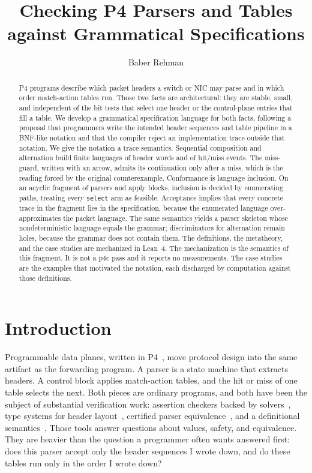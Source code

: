 \documentclass[a4paper,UKenglish,cleveref,autoref]{lipics-v2021}
\title{Checking P4 Parsers and Tables against Grammatical Specifications}
\author{Baber Rehman}{Huawei Technologies, Hong Kong SAR, China}{brehman@connect.hku.hk}{}{}
\begin{document}
\maketitle

\begin{abstract}
P4 programs describe which packet headers a switch or NIC may parse and in which order match-action tables run.
Those two facts are architectural: they are stable, small, and independent of the bit tests that select one header or the control-plane entries that fill a table.
We develop a grammatical specification language for both facts, following a proposal that programmers write the intended header sequences and table pipeline in a BNF-like notation and that the compiler reject an implementation trace outside that notation.
We give the notation a trace semantics.
Sequential composition and alternation build finite languages of header words and of hit/miss events.
The miss-guard, written with an arrow, admits its continuation only after a miss, which is the reading forced by the original counterexample.
Conformance is language inclusion.
On an acyclic fragment of parsers and apply blocks, inclusion is decided by enumerating paths, treating every \texttt{select} arm as feasible.
Acceptance implies that every concrete trace in the fragment lies in the specification, because the enumerated language over-approximates the packet language.
The same semantics yields a parser skeleton whose nondeterministic language equals the grammar; discriminators for alternation remain holes, because the grammar does not contain them.
The definitions, the metatheory, and the case studies are mechanized in Lean~4.
The mechanization is the semantics of this fragment.
It is not a p4c pass and it reports no measurements.
The case studies are the examples that motivated the notation, each discharged by computation against those definitions.
\end{abstract}

\section{Introduction}
\label{sec:intro}

Programmable data planes, written in P4~\cite{bosshart2014p4,p4langspec}, move protocol design into the same artifact as the forwarding program.
A parser is a state machine that extracts headers.
A control block applies match-action tables, and the hit or miss of one table selects the next.
Both pieces are ordinary programs, and both have been the subject of substantial verification work: assertion checkers backed by solvers~\cite{p4v,vera,assertp4}, type systems for header layout~\cite{safep4,depp4}, certified parser equivalence~\cite{leapfrog}, and a definitional semantics~\cite{petr4}.
Those tools answer questions about values, safety, and equivalence.
They are heavier than the question a programmer often wants answered first: does this parser accept only the header sequences I wrote down, and do these tables run only in the order I wrote down?
\end{document}
